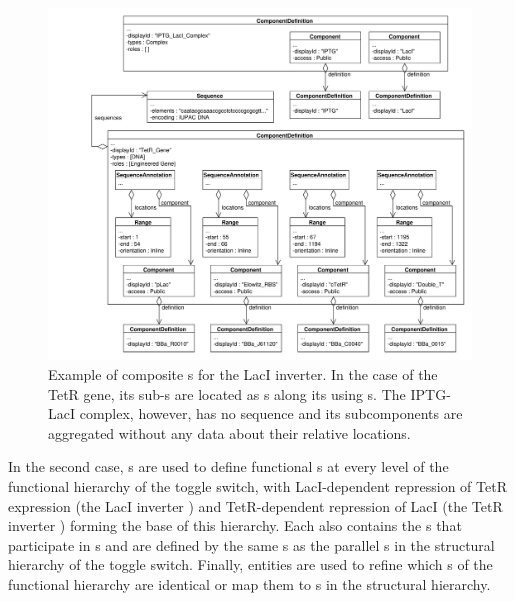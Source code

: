 \begin{figure}[ht]
\begin{center}
\includegraphics[width=\textwidth]{example_uml/toggle_2}
\caption[]{Example of composite s for the LacI inverter. In the case of the TetR gene, its sub-s are located as s along its  using s. The IPTG-LacI complex, however, has no sequence and its subcomponents are aggregated without any data about their relative locations.}
\label{uml:ex_comp_def_compo}
\end{center}
\end{figure}

In the second case, s are used to define functional s at every level of the functional hierarchy of the toggle switch, with LacI-dependent repression of TetR expression (the LacI inverter ) and TetR-dependent repression of LacI (the TetR inverter ) forming the base of this hierarchy. Each  also contains the s that participate in s and are defined by the same s as the parallel s in the structural hierarchy of the toggle switch. Finally,  entities are used to refine which s of the functional hierarchy are identical or map them to s in the structural hierarchy.


